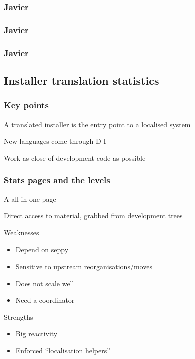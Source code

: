 \documentclass{beamer}
\begin{document}
\begin{frame}
  \frametitle{Javier}
\end{frame}

\begin{frame}
  \frametitle{Javier}
\end{frame}

\begin{frame}
  \frametitle{Javier}
\end{frame}

\subsection{Installer translation statistics}

\begin{frame}
  \frametitle{Key points}
	\begin{block}
		{A translated installer is the entry point to a localised system}
	\end{block}
	\begin{block}
		{New languages come through D-I}
	\end{block}
	\begin{block}
		{Work as close of development code as possible}
	\end{block}
\end{frame}

\begin{frame}
  \frametitle{Stats pages and the levels}
	\begin{block}
		{A all in one page}
	\end{block}
	\begin{block}
		{Direct access to material, grabbed from development trees}
	\end{block}
	\begin{block}
		{Weaknesses}
		\begin{itemize}
		\item
			Depend on seppy
		\item
			Sensitive to upstream reorganisations/moves
		\item
			Does not scale well
		\item
			Need a coordinator
		\end{itemize}
	\end{block}
	\begin{block}
		{Strengths}
		\begin{itemize}
		\item
			Big reactivity
		\item
			Enforced ``localisation helpers''
		\end{itemize}
	\end{block}
\end{frame}
\end{document}
